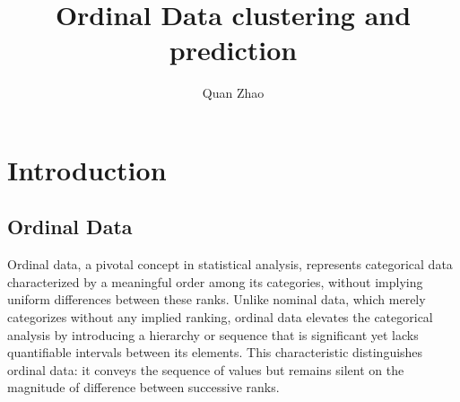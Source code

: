 \documentclass{article}
\begin{document}
\title{Ordinal Data clustering and prediction}

\author{Quan Zhao}

\maketitle



\section{Introduction}




\subsection*{Ordinal Data}

Ordinal data, a pivotal concept in statistical analysis, represents categorical data characterized by a meaningful order among its categories, without implying uniform differences between these ranks. Unlike nominal data, which merely categorizes without any implied ranking, ordinal data elevates the categorical analysis by introducing a hierarchy or sequence that is significant yet lacks quantifiable intervals between its elements. This characteristic distinguishes ordinal data: it conveys the sequence of values but remains silent on the magnitude of difference between successive ranks.
\end{document}

